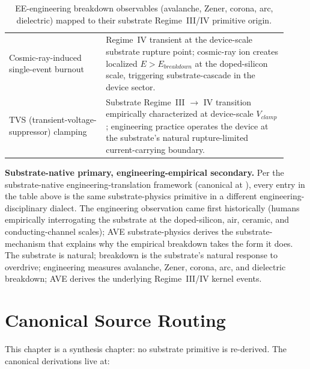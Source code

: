 \begin{table}[htbp]
\begin{tabular}{p{0.32\linewidth} p{0.60\linewidth}}
Cosmic-ray-induced single-event burnout & Regime~IV transient at the device-scale substrate rupture point; cosmic-ray ion creates localized $E > E_{breakdown}$ at the doped-silicon scale, triggering substrate-cascade in the device sector. \\
TVS (transient-voltage-suppressor) clamping & Substrate Regime~III $\to$ IV transition empirically characterized at device-scale $V_{clamp}$; engineering practice operates the device at the substrate's natural rupture-limited current-carrying boundary. \\
\bottomrule
\end{tabular}
\caption{EE-engineering breakdown observables (avalanche, Zener, corona, arc, dielectric) mapped to their substrate Regime~III/IV primitive origin.}
\label{tab:vol9_breakdown_ee_translation}
\end{table}

\noindent
\textbf{Substrate-native primary, engineering-empirical secondary.} Per the substrate-native engineering-translation framework (canonical at ), every entry in the table above is the same substrate-physics primitive in a different engineering-disciplinary dialect. The engineering observation came first historically (humans empirically interrogating the substrate at the doped-silicon, air, ceramic, and conducting-channel scales); AVE substrate-physics derives the substrate-mechanism that explains why the empirical breakdown takes the form it does. The substrate is natural; breakdown is the substrate's natural response to overdrive; engineering measures avalanche, Zener, corona, arc, and dielectric breakdown; AVE derives the underlying Regime~III/IV kernel events.

\section{Canonical Source Routing}
\label{sec:vol9_breakdown_canonical_sources}

This chapter is a synthesis chapter: no substrate primitive is re-derived. The canonical derivations live at:

